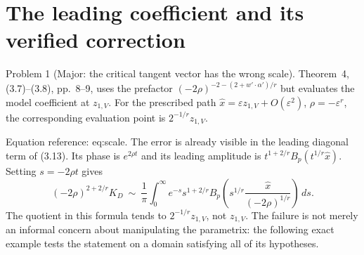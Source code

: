\documentclass[10pt]{article}
\begin{document}
\section*{The leading coefficient and its verified correction}
Problem 1 (Major: the critical tangent vector has the wrong scale).  Theorem 4, (3.7)–(3.8), pp. 8–9, uses the prefactor \((-2\rho)^{-2-(2+w'\cdot\alpha')/r}\) but evaluates the model coefficient at \(z_{1,V}\). For the prescribed path \(\widehat x=\varepsilon z_{1,V}+O(\varepsilon^2)\), \(\rho=-\varepsilon^r\), the corresponding evaluation point is \(2^{-1/r}z_{1,V}\).\par
Equation reference: eq:scale. The error is already visible in the leading diagonal term of (3.13). Its phase is \(e^{2\rho t}\) and its leading amplitude is \(t^{1+2/r}B_p(t^{1/r}\widehat x)\). Setting \(s=-2\rho t\) gives \[(-2\rho)^{2+2/r}K_D
 \ \sim\ \frac1\pi\int_0^\infty e^{-s}s^{1+2/r}
 B_p\left(s^{1/r}\frac{\widehat x}{(-2\rho)^{1/r}}\right)\,ds.
 \] The quotient in this formula tends to \(2^{-1/r}z_{1,V}\), not \(z_{1,V}\). The failure is not merely an informal concern about manipulating the parametrix: the following exact example tests the statement on a domain satisfying all of its hypotheses.\par
\end{document}
